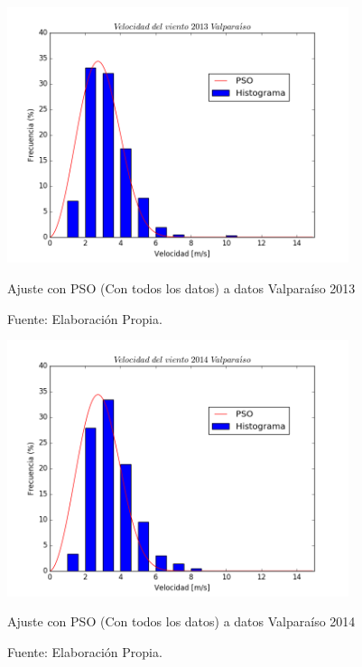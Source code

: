 \begin{figure}[H]
    \centering
    \includegraphics[height=75mm]{figures/result_2013_fit_all_data.png}
    \caption{Ajuste con PSO (Con todos los datos) a datos Valparaíso 2013}
    \vspace{-.25cm}
    \caption*{Fuente: Elaboración Propia.}
    \label{fig:pso_valpo_13_all_data}
\end{figure}
\begin{figure}[H]
    \centering
    \includegraphics[height=75mm]{figures/result_2014_fit_all_data.png}
    \caption{Ajuste con PSO (Con todos los datos) a datos Valparaíso 2014}
    \vspace{-.25cm}
    \caption*{Fuente: Elaboración Propia.}
    \label{fig:pso_valpo_14_all_data}
\end{figure}
